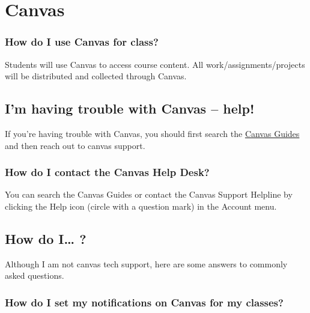 \documentclass[
]{book}
\begin{document}
\hypertarget{canvas}{%
\section{Canvas}\label{canvas}}

\hypertarget{how-do-i-use-canvas-for-class}{%
\subsubsection{How do I use Canvas for class?}\label{how-do-i-use-canvas-for-class}}

Students will use Canvas to access course content.
All work/assignments/projects will be distributed and collected through Canvas.

\hypertarget{im-having-trouble-with-canvas-help}{%
\subsection{I'm having trouble with Canvas -- help!}\label{im-having-trouble-with-canvas-help}}

If you're having trouble with Canvas, you should first search the \href{https://community.canvaslms.com/t5/Canvas-Basics-Guide/tkb-p/basics}{Canvas Guides} and then reach out to canvas support.

\hypertarget{how-do-i-contact-the-canvas-help-desk}{%
\subsubsection{How do I contact the Canvas Help Desk?}\label{how-do-i-contact-the-canvas-help-desk}}

You can search the Canvas Guides or contact the Canvas Support Helpline by clicking the Help icon (circle with a question mark) in the Account menu.

\hypertarget{how-do-i}{%
\subsection{How do I\ldots{} ?}\label{how-do-i}}

Although I am not canvas tech support, here are some answers to commonly asked questions.

\hypertarget{how-do-i-set-my-notifications-on-canvas-for-my-classes}{%
\subsubsection{How do I set my notifications on Canvas for my classes?}\label{how-do-i-set-my-notifications-on-canvas-for-my-classes}}
\end{document}
